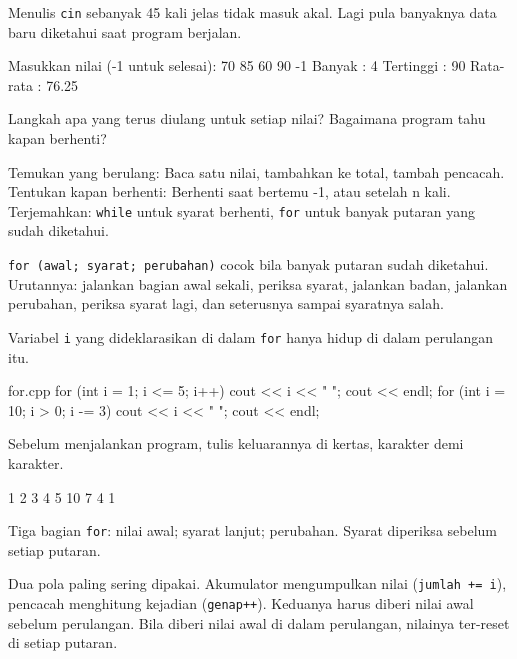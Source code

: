 \documentclass[a4paper]{article}
\begin{document}
Menulis \texttt{cin} sebanyak 45 kali jelas tidak masuk akal. Lagi pula banyaknya data baru diketahui saat program berjalan.

\begin{MKeluaran}[title={Tampilan yang diinginkan}]
Masukkan nilai (-1 untuk selesai):
70 85 60 90 -1
Banyak    : 4
Tertinggi : 90
Rata-rata : 76.25
\end{MKeluaran}
\begin{Tebak}
Langkah apa yang terus diulang untuk setiap nilai? Bagaimana program tahu kapan berhenti?
\end{Tebak}
\begin{Jawaban}
Temukan yang berulang: Baca satu nilai, tambahkan ke total, tambah pencacah. Tentukan kapan berhenti: Berhenti saat bertemu -1, atau setelah n kali. Terjemahkan: \texttt{while} untuk syarat berhenti, \texttt{for} untuk banyak putaran yang sudah diketahui.
\end{Jawaban}
\texttt{for (awal; syarat; perubahan)} cocok bila banyak putaran sudah diketahui. Urutannya: jalankan bagian awal sekali, periksa syarat, jalankan badan, jalankan perubahan, periksa syarat lagi, dan seterusnya sampai syaratnya salah.

Variabel \texttt{i} yang dideklarasikan di dalam \texttt{for} hanya hidup di dalam perulangan itu.

\begin{MKode}{for.cpp}
for (int i = 1; i <= 5; i++) {
    cout << i << " ";
}
cout << endl;
for (int i = 10; i > 0; i -= 3) {
    cout << i << " ";
}
cout << endl;
\end{MKode}
\begin{Tebak}[]
Sebelum menjalankan program, tulis keluarannya di kertas, karakter demi karakter.
\end{Tebak}
\begin{Jawaban}[]
\begin{MKeluaran}[]
1 2 3 4 5 
10 7 4 1 
\end{MKeluaran}
Tiga bagian \texttt{for}: nilai awal; syarat lanjut; perubahan. Syarat diperiksa sebelum setiap putaran.
\end{Jawaban}
Dua pola paling sering dipakai. Akumulator mengumpulkan nilai (\texttt{jumlah += i}), pencacah menghitung kejadian (\texttt{genap++}). Keduanya harus diberi nilai awal sebelum perulangan. Bila diberi nilai awal di dalam perulangan, nilainya ter-reset di setiap putaran.
\end{document}
